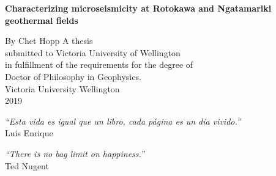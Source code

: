 \documentclass[a4paper,12pt,twoside,openright,english]{book}
\numberwithin{figure}{chapter}
\numberwithin{table}{chapter}
\begin{document}
\frontmatter

\begin{titlepage}
\doublespacing
	\begin{center}
	\vspace*{2\baselineskip}
		\textbf{\LARGE{Characterizing microseismicity at Rotokawa and Ngatamariki geothermal fields
}}

		\vspace*{2\baselineskip}
		By \vspace*{2\baselineskip}
		Chet Hopp \vspace*{2\baselineskip}
 \vspace*{1\baselineskip}
\singlespacing
		A thesis\\ submitted to Victoria University of Wellington\\
		in fulfillment of the requirements for the degree of
		\\Doctor of Philosophy in Geophysics.\\
		\vspace*{3\baselineskip}
		Victoria University Wellington\\2019
  \end{center}
\end{titlepage}
\singlespacing
\clearpage{\pagestyle{empty}\cleardoublepage} %

\thispagestyle{empty} %
  \begin{center}
		\vspace*{4\baselineskip}
		\emph{``Esta vida es igual que un libro, cada p\'{a}gina es un d\'{i}a vivido.''}\\
		\vspace*{1\baselineskip}
		Luis Enrique

		\vspace*{4\baselineskip}
		\emph{``There is no bag limit on happiness.''}\\
		\vspace*{1\baselineskip}
		Ted Nugent

	\end{center}
\clearpage{\pagestyle{empty}\cleardoublepage}%
\frontmatter

\onehalfspacing

\clearpage{\pagestyle{empty}\cleardoublepage}
\pagestyle{plain}%


\end{document}
